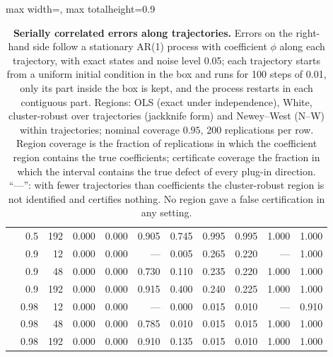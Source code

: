 \begin{table}[!htbp]
\begin{adjustbox}{max width=\textwidth, max totalheight=0.9\textheight}
\begin{tabular}{lrrrrrrrrrr}
 & 0.5 & 192 & 0.000 & 0.000 & 0.905 & 0.745 & 0.995 & 0.995 & 1.000 & 1.000 \\
 & 0.9 & 12 & 0.000 & 0.000 & --- & 0.005 & 0.265 & 0.220 & --- & 1.000 \\
 & 0.9 & 48 & 0.000 & 0.000 & 0.730 & 0.110 & 0.235 & 0.220 & 1.000 & 1.000 \\
 & 0.9 & 192 & 0.000 & 0.000 & 0.915 & 0.400 & 0.240 & 0.225 & 1.000 & 1.000 \\
 & 0.98 & 12 & 0.000 & 0.000 & --- & 0.000 & 0.015 & 0.010 & --- & 0.910 \\
 & 0.98 & 48 & 0.000 & 0.000 & 0.785 & 0.010 & 0.015 & 0.015 & 1.000 & 1.000 \\
 & 0.98 & 192 & 0.000 & 0.000 & 0.910 & 0.135 & 0.015 & 0.010 & 1.000 & 1.000 \\
\bottomrule
\end{tabular}
\end{adjustbox}
\caption{\textbf{Serially correlated errors along trajectories.} Errors on the right-hand side follow a stationary AR(1) process with coefficient $\phi$ along each trajectory, with exact states and noise level 0.05; each trajectory starts from a uniform initial condition in the box and runs for 100 steps of 0.01, only its part inside the box is kept, and the process restarts in each contiguous part. Regions: OLS (exact under independence), White, cluster-robust over trajectories (jackknife form) and Newey--West (N--W) within trajectories; nominal coverage $0.95$, 200 replications per row. Region coverage is the fraction of replications in which the coefficient region contains the true coefficients; certificate coverage the fraction in which the interval contains the true defect of every plug-in direction. ``---'': with fewer trajectories than coefficients the cluster-robust region is not identified and certifies nothing. No region gave a false certification in any setting.}
\label{stab:dependence}
\end{table}
